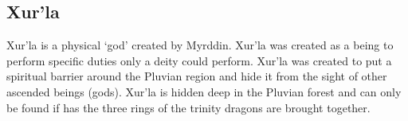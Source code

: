 \subsection{Xur'la}

Xur'la is a physical `god' created by Myrddin. Xur'la was created as a being to perform specific duties only a deity could perform. Xur'la was created to put a spiritual barrier around the Pluvian region and hide it from the sight of other ascended beings (gods). Xur'la is hidden deep in the Pluvian forest and can only be found if has the three rings of the trinity dragons are brought together.



